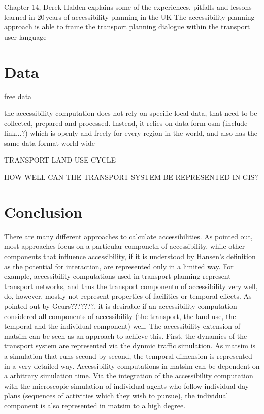Chapter 14, Derek Halden explains some of the experiences, pitfalls and lessons learned in 20\,years of accessibility 
planning in the UK The accessibility planning approach is able to frame the transport planning dialogue within 
the transport user language 


\section{Data}
free data

the accessibility computation does not rely on specific local data, that need to be collected, prepared and processed. 
Instead, it relies on data form \gls{osm} (include link...?) which is openly and freely for every region in the world, 
and also has the same data format world-wide


TRANSPORT-LAND-USE-CYCLE

HOW WELL CAN THE TRANSPORT SYSTEM BE REPRESENTED IN GIS?




\section{Conclusion}
There are many different approaches to calculate accessibilities. As pointed out, most approaches focus on a particular 
componetn of accessibility, while other components that influence accessibility, if it is understood by Hansen's definition 
as the potential for interaction, are represented only in a limited way. For example, accessibility computations used in 
transport planning represent transport networks, and thus the transport componentn of accessibility very well, do, however, 
mostly not represent properties of facilities or temporal effects. As pointed out by Geurs???????, it is desirable if an 
accessibility computation considered all components of accessibility (the transport, the land use, the temporal and the 
individual component) well. The accessibility extension of \gls{matsim} can be seen as an approach to achieve this. First, 
the dynamics of the transport system are represented via the dynmic traffic simulation. As \gls{matsim} is a simulation 
that runs second by second, the temporal dimension is represented in a very detailed way. Accessibility computations in 
\gls{matsim} can be dependent on a arbitrary simulation time. Via the integration of the accessibility computation with 
the microscopic simulation of individual agents who follow individual day plans (sequences of activities which they 
wish to pursue), the individual component is also represented in \gls{matsim} to a high degree.

